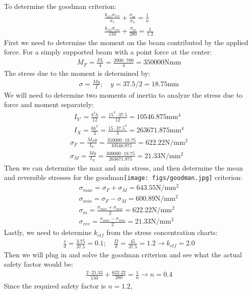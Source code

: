 \documentclass[12 pt]{article}
\begin{document}
\subsection*{}
To determine the goodman criterion:
\begin{align*}
    \frac{k_{ctf}\sigma_{rev}}{\sigma_e}+\frac{\sigma_m}{\sigma_u}=\frac{1}{n} \\
    \frac{k_{ctf}\sigma_{rev}}{150}+\frac{\sigma_m}{280}=\frac{1}{1.2}
\end{align*}
First we need to determine the moment on the beam contributed by the applied force. For a simply supported beam with a
point force at the center:
\begin{align*}
    M_F=\frac{FL}{4}=\frac{2000\cdot700}{4}=350000\text{Nmm}
\end{align*}
The stress due to the moment is determined by:
\begin{align*}
    \sigma=\frac{My}{I};\quad y=37.5/2=18.75\text{mm}
\end{align*}
We will need to determine two moments of inertia to analyze the stress due to force and moment separately:
\begin{align*}
    I_{Y'}=\frac{b^3h}{12}=\frac{15^3\cdot37.5}{12}=10546.875\text{mm$^4$} \\
    I_{X}=\frac{bh^3}{3}=\frac{15\cdot37.5^3}{3}=263671.875\text{mm$^4$}
\end{align*}
\begin{align*}
    \sigma_F=\frac{M_Fy}{I_{Y'}}=\frac{350000\cdot18.75}{10546.875}=622.22\text{N/mm$^2$} \\
    \sigma_M=\frac{My}{I_X}=\frac{300000\cdot18.75}{263671.875}=21.33\text{N/mm$^2$}
\end{align*}
Then we can determine the max and min stress, and then determine the mean and reversible stresses for the goodman\texttt{[image: figs/goodman.jpg]}
criterion:
\begin{align*}
    \sigma_{max}=\sigma_F+\sigma_M=643.55\text{N/mm$^2$} \\
    \sigma_{min}=\sigma_F-\sigma_M=600.89\text{N/mm$^2$} \\
    \sigma_m=\frac{\sigma_{max}+\sigma_{min}}{2}=622.22\text{N/mm$^2$} \\
    \sigma_{rev}=\frac{\sigma_{max}-\sigma_{min}}{2}=21.33\text{N/mm$^2$}
\end{align*}
Lastly, we need to determine $k_{ctf}$ from the stress concentration charts:
\begin{align*}
    \frac{r}{d}=\frac{3.75}{37.5}=0.1;\quad\frac{D}{d}=\frac{45}{37.5}=1.2 \rightarrow k_{ctf}=2.0
\end{align*}
Then we will plug in and solve the goodman criterion and see what the actual safety factor would be:
\begin{align*}
    \frac{2\cdot21.33}{150}+\frac{622.22}{280}=\frac{1}{n} \rightarrow n=0.4
\end{align*}
Since the required safety factor is $n=1.2$, 
\end{document}
